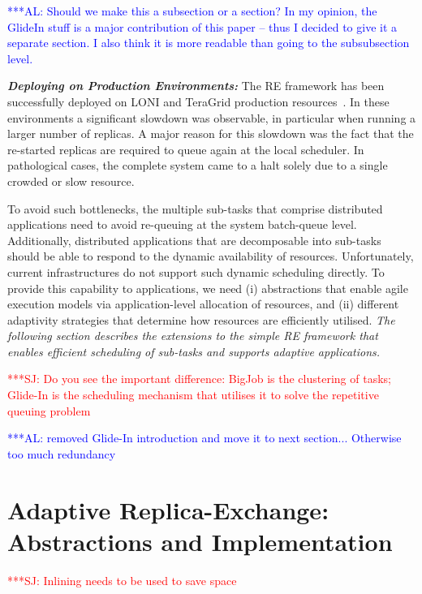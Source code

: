 \documentclass{rspublic}
\newcommand{\alnote}[1]{ {\textcolor{blue} { ***AL: #1 }}}
\newcommand{\jhanote}[1]{ {\textcolor{red} { ***SJ: #1 }}}
\newcommand{\alnote}[1]{}
\newcommand{\jhanote}[1]{}
\begin{document}
\alnote{Should we make this a subsection or a section? In my opinion,
the GlideIn stuff is a major contribution of this paper -- thus I decided to
give it a separate section. I also think it is more readable than going to the
subsubsection level.}           
         
\noindent
{\it \bf Deploying on Production Environments:} The RE framework has 
been successfully deployed on LONI and TeraGrid production 
resources~\citep{Luckow:2008la}. In these environments a significant
slowdown was observable, in particular when running a larger number
of replicas.
A major reason for this slowdown was the fact that
the re-started replicas are required to queue again at
the local scheduler.  In pathological cases, the complete system 
came to a halt solely due to a single crowded or slow resource.

To avoid such bottlenecks, the multiple sub-tasks that comprise
distributed applications need to avoid re-queuing at the system
batch-queue level.  Additionally, distributed applications that are
decomposable into sub-tasks should be able to respond to the dynamic
availability of resources.  Unfortunately, current infrastructures do
not support such dynamic scheduling directly. To provide
this capability to applications, we need (i) abstractions that enable
agile execution models via application-level allocation of resources,
and (ii) different adaptivity strategies that determine how resources
are efficiently utilised.  {\it The following section describes the
  extensions to the simple RE framework that enables efficient
  scheduling of sub-tasks and supports adaptive applications.}




\jhanote{Do you see the important difference: BigJob is the clustering
  of tasks; Glide-In is the scheduling mechanism that utilises it to
  solve the repetitive queuing problem}

\alnote{removed Glide-In introduction and move it to next
  section... Otherwise too much redundancy}
\vspace{-0.15in}
\section{Adaptive Replica-Exchange: Abstractions and Implementation}
\label{sec:glidein}
\jhanote{Inlining needs to be used to save space}
\end{document}
